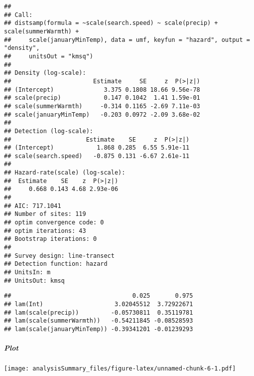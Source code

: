 \documentclass[
]{article}
\begin{document}
\begin{verbatim}
## 
## Call:
## distsamp(formula = ~scale(search.speed) ~ scale(precip) + scale(summerWarmth) + 
##     scale(januaryMinTemp), data = umf, keyfun = "hazard", output = "density", 
##     unitsOut = "kmsq")
## 
## Density (log-scale):
##                       Estimate     SE     z  P(>|z|)
## (Intercept)              3.375 0.1808 18.66 9.56e-78
## scale(precip)            0.147 0.1042  1.41 1.59e-01
## scale(summerWarmth)     -0.314 0.1165 -2.69 7.11e-03
## scale(januaryMinTemp)   -0.203 0.0972 -2.09 3.68e-02
## 
## Detection (log-scale):
##                     Estimate    SE     z  P(>|z|)
## (Intercept)            1.868 0.285  6.55 5.91e-11
## scale(search.speed)   -0.875 0.131 -6.67 2.61e-11
## 
## Hazard-rate(scale) (log-scale):
##  Estimate    SE    z  P(>|z|)
##     0.668 0.143 4.68 2.93e-06
## 
## AIC: 717.1041 
## Number of sites: 119
## optim convergence code: 0
## optim iterations: 43 
## Bootstrap iterations: 0 
## 
## Survey design: line-transect
## Detection function: hazard
## UnitsIn: m
## UnitsOut: kmsq
\end{verbatim}

\begin{verbatim}
##                                  0.025       0.975
## lam(Int)                    3.02045512  3.72922671
## lam(scale(precip))         -0.05730811  0.35119781
## lam(scale(summerWarmth))   -0.54211845 -0.08528593
## lam(scale(januaryMinTemp)) -0.39341201 -0.01239293
\end{verbatim}

\hypertarget{plot-1}{%
\subparagraph{Plot}\label{plot-1}}

\texttt{[image: analysisSummary\_files/figure-latex/unnamed-chunk-6-1.pdf]}
\end{document}
